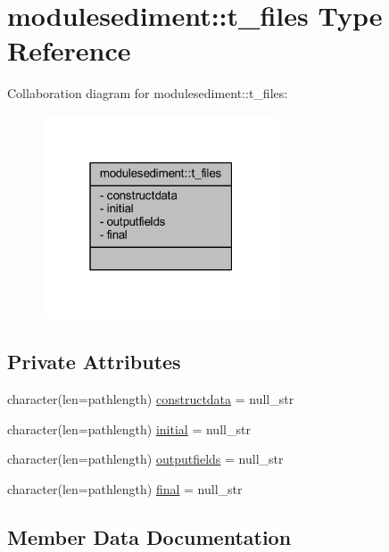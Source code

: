 \hypertarget{structmodulesediment_1_1t__files}{}\section{modulesediment\+:\+:t\+\_\+files Type Reference}
\label{structmodulesediment_1_1t__files}


Collaboration diagram for modulesediment\+:\+:t\+\_\+files\+:\nopagebreak
\begin{figure}[H]
\begin{center}
\leavevmode
\includegraphics[width=199pt]{structmodulesediment_1_1t__files__coll__graph}
\end{center}
\end{figure}
\subsection*{Private Attributes}
\begin{DoxyCompactItemize}
\item 
character(len=pathlength) \mbox{\hyperlink{structmodulesediment_1_1t__files_a302db1d997b09d086ac4df655abd95f6}{constructdata}} = null\+\_\+str
\item 
character(len=pathlength) \mbox{\hyperlink{structmodulesediment_1_1t__files_a336f90e71d4aaca59abf850649cc343b}{initial}} = null\+\_\+str
\item 
character(len=pathlength) \mbox{\hyperlink{structmodulesediment_1_1t__files_aef004e10320e09292fc0541e4a0e0f8f}{outputfields}} = null\+\_\+str
\item 
character(len=pathlength) \mbox{\hyperlink{structmodulesediment_1_1t__files_add3a9d13d0503d02318da01c04064385}{final}} = null\+\_\+str
\end{DoxyCompactItemize}


\subsection{Member Data Documentation}
\mbox{\label{structmodulesediment_1_1t__files_a302db1d997b09d086ac4df655abd95f6}} 
